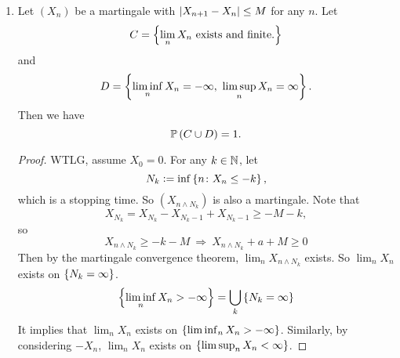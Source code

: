 \begin{exam}
    \begin{enumerate}[label=(\arabic{*})]
        \item Let $(X_n)$ be a martingale with $\left\lvert X_{n+1} - X_n\right\lvert \leq M$ for any $n$. Let
        \begin{equation*}
            C = \left\{\lim_n X_n \text{ exists and finite.}\right\}
        \end{equation*}
        and
        \begin{equation*}
            D = \left\{\liminf_n X_n = -\infty,~ \limsup_n X_n = \infty\right\}.
        \end{equation*}
        Then we have
        \begin{equation*}
            \mathbb{P}\left(C \cup D\right) = 1.
        \end{equation*}
        \begin{proof}
            WTLG, assume $X_0 = 0$. For any $k \in \mathbb{N}$, let
            \begin{equation*}
                N_k \vcentcolon= \inf\left\{n \colon X_n \leq -k\right\},
            \end{equation*}
            which is a stopping time. So $(X_{n \wedge N_k})$ is also a martingale. Note that
            \begin{equation*}
                X_{N_k} = X_{N_k} - X_{N_k - 1} + X_{N_k - 1} \geq -M-k,
            \end{equation*}
            so
            \begin{equation*}
                X_{n \wedge N_k} \geq -k - M ~\Rightarrow~ X_{n \wedge N_k} +a +M \geq 0
            \end{equation*}
            Then by the martingale convergence theorem, $\lim_n X_{n \wedge N_k}$ exists. So $\lim_n X_{n}$ exists on $\left\{N_k = \infty\right\}$.
            \begin{equation*}
                \left\{\liminf_n X_n > -\infty\right\} = \bigcup_k \left\{N_k = \infty\right\}
            \end{equation*}
            It implies that $\lim_n X_{n}$ exists on $\left\{\liminf_n X_n > -\infty\right\}$. Similarly, by considering $-X_n$, $\lim_n X_{n}$ exists on $\left\{\limsup_n X_n < \infty\right\}$. \qedhere
        \end{proof}


\end{enumerate}
\end{exam}
